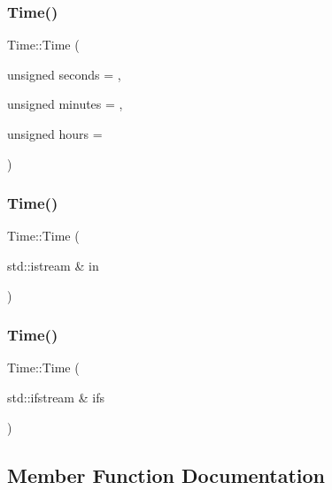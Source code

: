 \subsubsection{\texorpdfstring{Time()}{Time()}\hspace{0.1cm}{\footnotesize\ttfamily [1/3]}}
{\footnotesize\ttfamily Time\+::\+Time (\begin{DoxyParamCaption}\item[{unsigned}]{seconds = {},  }\item[{unsigned}]{minutes = {},  }\item[{unsigned}]{hours = {} }\end{DoxyParamCaption})}

\mbox{\label{classTime_a85ec464631df4b1284f2e0d53f549750}} 
\subsubsection{\texorpdfstring{Time()}{Time()}\hspace{0.1cm}{\footnotesize\ttfamily [2/3]}}
{\footnotesize\ttfamily Time\+::\+Time (\begin{DoxyParamCaption}\item[{std\+::istream \&}]{in }\end{DoxyParamCaption})}

\mbox{\label{classTime_a9f96dc51f4ad6a98493ebc129b8f125a}} 
\subsubsection{\texorpdfstring{Time()}{Time()}\hspace{0.1cm}{\footnotesize\ttfamily [3/3]}}
{\footnotesize\ttfamily Time\+::\+Time (\begin{DoxyParamCaption}\item[{std\+::ifstream \&}]{ifs }\end{DoxyParamCaption})}



\subsection{Member Function Documentation}
\mbox{\label{classTime_af02e08b3bf203d9cedbf9f629cddcc1f}} 
